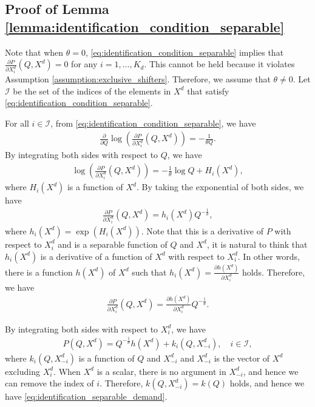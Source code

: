 \documentclass[11pt, a4paper]{article}
\theoremstyle{remark}
\begin{document}
\subsection{Proof of Lemma \ref{lemma:identification_condition_separable}}
Note that when $\theta = 0$, \eqref{eq:identification_condition_separable} implies that $\frac{\partial P}{\partial X^{d}_i}(Q, X^{d}) = 0$ for any $i = 1, \ldots, K_d$.
This cannot be held because it violates Assumption \ref{assumption:exclusive_shifters}.
Therefore, we assume that $\theta \ne 0$.
Let $\mathcal{I}$ be the set of the indices of the elements in $X^{d}$ that satisfy \eqref{eq:identification_condition_separable}.

For all $i \in \mathcal{I}$, from \eqref{eq:identification_condition_separable}, we have
\begin{align}
    \frac{\partial }{\partial Q}\log \left(\frac{\partial P}{\partial X^{d}_i}(Q, X^{d})\right) = -\frac{1}{\theta Q}.
\end{align}
By integrating both sides with respect to $Q$, we have
\begin{align}
    \log \left(\frac{\partial P}{\partial X^{d}_i}(Q, X^{d})\right) = -\frac{1}{\theta}\log Q + H_i(X^{d}),
\end{align}
where $H_i(X^{d})$ is a function of $X^{d}$.
By taking the exponential of both sides, we have
\begin{align}
    \frac{\partial P}{\partial X^{d}_i}(Q, X^{d}) = h_i(X^{d})Q^{-\frac{1}{\theta}},
\end{align}
where $h_i(X^{d})  = \exp(H_i(X^{d}))$.
Note that this is a derivative of $P$ with respect to $X^{d}_i$ and is a separable function of $Q$ and $X^{d}$, 
it is natural to think that $h_i(X^{d})$ is a derivative of a function of $X^{d}$ with respect to $X^{d}_i$.
In other words, there is a function $h(X^{d})$ of $X^{d}$ such that $h_i(X^{d}) = \frac{\partial h(X^{d})}{\partial X^{d}_i}$ holds.
Therefore, we have
\begin{align}
    \frac{\partial P}{\partial X^{d}_i}(Q, X^{d}) = \frac{\partial h(X^{d})}{\partial X^{d}_i} Q^{-\frac{1}{\theta}}.
\end{align}

By integrating both sides with respect to $X^{d}_i$, we have
\begin{align}
    P(Q, X^{d}) = Q^{-\frac{1}{\theta}}h(X^{d}) + k_i(Q, X^{d}_{-i}), \quad i \in \mathcal{I}, \label{eq:identification_separable_demand_i}
\end{align}
where $k_i(Q, X^{d}_{-i})$ is a function of $Q$ and $X^{d}_{-i}$ and $X^{d}_{-i}$ is the vector of $X^{d}$ excluding $X^{d}_i$.
When $X^{d}$ is a scalar, there is no argument in $X^{d}_{-i}$, and hence we can remove the index of $i$.
Therefore, $k(Q, X^{d}_{-i}) = k(Q)$ holds, and hence we have \eqref{eq:identification_separable_demand}.
\end{document}
